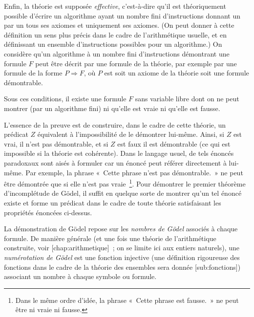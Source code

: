 Enfin, la théorie est supposée \emph{effective}, c'est-à-dire qu'il est théoriquement possible d'écrire un algorithme ayant un nombre fini d'instructions donnant un par un tous ses axiomes et uniquement ses axiomes. 
(On peut donner à cette définition un sens plus précis dans le cadre de l'arithmétique usuelle, et en définissant un ensemble d'instructions possibles pour un algorithme.) 
On considère qu'un algorithme à un nombre fini d'instructions démontrant une formule $F$ peut être décrit par une formule de la théorie, par exemple par une formule de la forme $P \Rightarrow F$, où $P$ est soit un axiome de la théorie soit une formule démontrable.

\blank[medium]

\noindent {} Sous ces conditions, il existe une formule $F$ sans variable libre dont on ne peut montrer (par un algorithme fini) ni qu'elle est vraie ni qu'elle est fausse.

\blank[medium]

L'essence de la preuve est de construire, dans le cadre de cette théorie, un prédicat $Z$ équivalent à l'impossibilité de le démontrer lui-même. 
Ainsi, si $Z$ est vrai, il n'est pas démontrable, et si $Z$ est faux il est démontrable (ce qui est impossible si la théorie est cohérente). 
Dans le langage usuel, de tels énoncés paradoxaux sont aisés à formuler car un énoncé peut référer directement à lui-même. 
Par exemple, la phrase « Cette phrase n'est pas démontrable. » ne peut être démontrée que si elle n'est pas vraie~\footnote{ Dans le même ordre d'idée, la phrase « Cette phrase est fausse. » ne peut être ni vraie ni fausse.}.
Pour démontrer le premier théorème d'incomplétude de Gödel, il suffit en quelque sorte de montrer qu'un tel énoncé existe et forme un prédicat dans le cadre de toute théorie satisfaisant les propriétés énoncées ci-dessus.

La démonstration de Gödel repose sur les \emph{nombres de Gödel} associés à chaque formule. 
De manière générale (et une fois une théorie de l'arithmétique construite, voir [chap:arithmetique] ; on se limite ici aux entiers naturels), une \emph{numérotation de Gödel} est une fonction injective (une définition rigoureuse des fonctions dans le cadre de la théorie des ensembles sera donnée [sub:fonctions]) associant un nombre à chaque symbole ou formule. 

